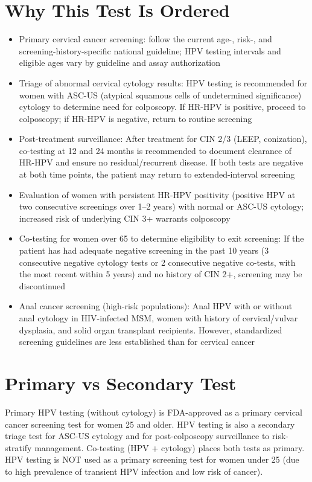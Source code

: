 \section*{Why This Test Is Ordered}
\begin{itemize}
  \item Primary cervical cancer screening: follow the current age-, risk-, and screening-history-specific national guideline; HPV testing intervals and eligible ages vary by guideline and assay authorization \cite{uspstf2018cervical}
  \item Triage of abnormal cervical cytology results: HPV testing is recommended for women with ASC-US (atypical squamous cells of undetermined significance) cytology to determine need for colposcopy. If HR-HPV is positive, proceed to colposcopy; if HR-HPV is negative, return to routine screening
  \item Post-treatment surveillance: After treatment for CIN 2/3 (LEEP, conization), co-testing at 12 and 24 months is recommended to document clearance of HR-HPV and ensure no residual/recurrent disease. If both tests are negative at both time points, the patient may return to extended-interval screening
  \item Evaluation of women with persistent HR-HPV positivity (positive HPV at two consecutive screenings over 1--2 years) with normal or ASC-US cytology; increased risk of underlying CIN 3+ warrants colposcopy
  \item Co-testing for women over 65 to determine eligibility to exit screening: If the patient has had adequate negative screening in the past 10 years (3 consecutive negative cytology tests or 2 consecutive negative co-tests, with the most recent within 5 years) and no history of CIN 2+, screening may be discontinued
  \item Anal cancer screening (high-risk populations): Anal HPV with or without anal cytology in HIV-infected MSM, women with history of cervical/vulvar dysplasia, and solid organ transplant recipients. However, standardized screening guidelines are less established than for cervical cancer
\end{itemize}

\section*{Primary vs Secondary Test}
Primary HPV testing (without cytology) is FDA-approved as a primary cervical cancer screening test for women 25 and older. HPV testing is also a secondary triage test for ASC-US cytology and for post-colposcopy surveillance to risk-stratify management. Co-testing (HPV + cytology) places both tests as primary. HPV testing is NOT used as a primary screening test for women under 25 (due to high prevalence of transient HPV infection and low risk of cancer).

